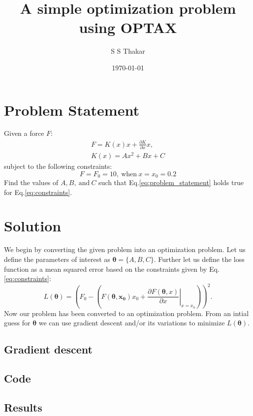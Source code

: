 \documentclass[11pt]{article}
\title{A simple optimization problem using OPTAX}
\date{\today}
\author{S S Thakar}
\begin{document}
\maketitle
\section{Problem Statement}
Given a force $F$:
\begin{equation}
  \begin{split}
    F = K(x)x + \frac{\partial K}{\partial x}x, \\
    K(x) = Ax^2 + Bx +C
    \label{eq:problem_statement}
    \end{split}
\end{equation}
subject to the following constraints:
\begin{equation}
  F=F_0=10, \ \text{when} \ x=x_0=0.2
    \label{eq:constraints}
\end{equation}
Find the values of $A,B, \ \text{and} \ C$ such that Eq.\ref{eq:problem_statement} holds true for Eq.\ref{eq:constraints}.
\section{Solution}
We begin by converting the given problem into an optimization problem. Let us define the parameters of interest as $\boldsymbol{\theta}=\{A,B,C\}$. 
Further let us define the loss function as a mean squared error based on the constraints given by Eq.\ref{eq:constraints}:
\begin{equation}
  L(\boldsymbol{\theta}) = \left( F_0 - \left(F(\boldsymbol{\theta,x_0})x_0 + \left.\frac{\partial F(\boldsymbol{\theta},x)}{\partial x}\right|_{x=x_0}\right)\right)^2.
    \label{eq:loss_function}
\end{equation}
Now our problem has been converted to an optimization problem. From an intial guess for $\boldsymbol{\theta}$ we can use gradient descent and/or its variations to minimize $L(\boldsymbol{\theta})$.
\subsection{Gradient descent}
\subsection{Code}
\subsection{Results}
\end{document}

